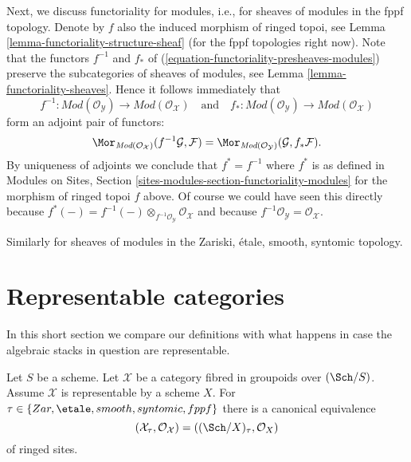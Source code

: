 \medskip\noindent
Next, we discuss functoriality for modules, i.e., for sheaves of modules
in the fppf topology. Denote by $f$ also the induced morphism of ringed
topoi, see
Lemma \ref{lemma-functoriality-structure-sheaf}
(for the fppf topologies right now). Note that the functors
$f^{-1}$ and $f_*$ of (\ref{equation-functoriality-presheaves-modules})
preserve the subcategories of sheaves of modules, see
Lemma \ref{lemma-functoriality-sheaves}.
Hence it follows immediately that
\begin{equation}
\label{equation-functoriality-sheaves-modules}
f^{-1} :
\textit{Mod}(\mathcal{O}_\mathcal{Y})
\longrightarrow
\textit{Mod}(\mathcal{O}_\mathcal{X})
\quad\text{and}\quad
f_* :
\textit{Mod}(\mathcal{O}_\mathcal{Y})
\longrightarrow
\textit{Mod}(\mathcal{O}_\mathcal{X})
\end{equation}
form an adjoint pair of functors:
$$
\Mor_{\textit{Mod}(\mathcal{O}_\mathcal{X})}(
f^{-1}\mathcal{G}, \mathcal{F})
=
\Mor_{\textit{Mod}(\mathcal{O}_\mathcal{Y})}(
\mathcal{G}, f_*\mathcal{F}).
$$
By uniqueness of adjoints we conclude that
$f^* = f^{-1}$ where $f^*$ is as defined in
Modules on Sites, Section \ref{sites-modules-section-functoriality-modules}
for the morphism of ringed topoi $f$ above. Of course we could have
seen this directly because
$f^*(-) = f^{-1}(-) \otimes_{f^{-1}\mathcal{O}_\mathcal{Y}}
\mathcal{O}_\mathcal{X}$ and because
$f^{-1}\mathcal{O}_\mathcal{Y} = \mathcal{O}_\mathcal{X}$.

\medskip\noindent
Similarly for sheaves of modules in the Zariski, \'etale, smooth, syntomic
topology.



\section{Representable categories}
\label{section-representable}

\noindent
In this short section we compare our definitions with what happens
in case the algebraic stacks in question are representable.

\begin{lemma}
\label{lemma-compare-with-scheme}
Let $S$ be a scheme. Let $\mathcal{X}$ be a category fibred
in groupoids over $(\Sch/S)$. Assume $\mathcal{X}$ is representable
by a scheme $X$. For $\tau \in \{Zar,\linebreak[0] \etale,\linebreak[0]
smooth,\linebreak[0] syntomic,\linebreak[0] fppf\}$
there is a canonical equivalence
$$
(\mathcal{X}_\tau, \mathcal{O}_\mathcal{X}) =
((\Sch/X)_\tau, \mathcal{O}_X)
$$
of ringed sites.
\end{lemma}

